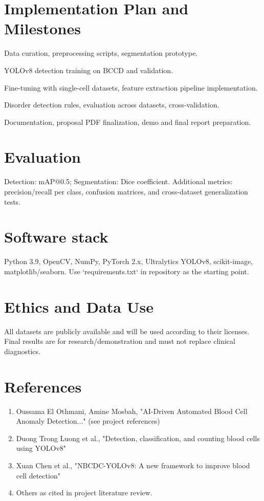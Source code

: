 \documentclass[11pt,a4paper]{article}
\begin{document}
\section{Implementation Plan and Milestones}
\begin{description}[leftmargin=!,labelwidth=3cm]
  \item[Week 1--2] Data curation, preprocessing scripts, segmentation prototype.
  \item[Week 3--5] YOLOv8 detection training on BCCD and validation.
  \item[Week 6--8] Fine-tuning with single-cell datasets, feature extraction pipeline implementation.
  \item[Week 9--10] Disorder detection rules, evaluation across datasets, cross-validation.
  \item[Week 11--12] Documentation, proposal PDF finalization, demo and final report preparation.
\end{description}

\section{Evaluation}
Detection: mAP@0.5; Segmentation: Dice coefficient. Additional metrics: precision/recall per class, confusion matrices, and cross-dataset generalization tests.

\section{Software stack}
Python 3.9, OpenCV, NumPy, PyTorch 2.x, Ultralytics YOLOv8, scikit-image, matplotlib/seaborn. Use `requirements.txt` in repository as the starting point.

\section{Ethics and Data Use}
All datasets are publicly available and will be used according to their licenses. Final results are for research/demonstration and must not replace clinical diagnostics.

\section{References}
\begin{enumerate}
  \item Oussama El Othmani, Amine Mosbah, "AI-Driven Automated Blood Cell Anomaly Detection..." (see project references)
  \item Duong Trong Luong et al., "Detection, classification, and counting blood cells using YOLOv8"
  \item Xuan Chen et al., "NBCDC-YOLOv8: A new framework to improve blood cell detection"
  \item Others as cited in project literature review.
\end{enumerate}
\end{document}
